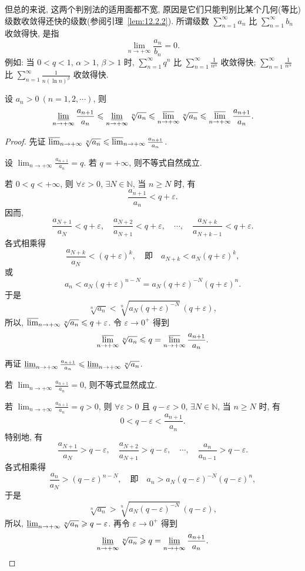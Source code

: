 但总的来说, 这两个判别法的适用面都不宽, 原因是它们只能判别比某个几何(等比)级数收敛得还快的级数(参阅引理~\ref{lem:12.2.2}). 所谓级数 $\sum_{n=1}^{\infty}a_{n}$ 比 $\sum_{n=1}^{\infty}b_{n}$ 收敛得快, 是指
\[
  \lim_{n\to+\infty}\frac{a_{n}}{b_{n}}=0.
\]
例如: 当 $0<q<1$, $\alpha>1$, $\beta>1$ 时, $\sum_{n=1}^{\infty}q^{n}$ 比 $\sum_{n=1}^{\infty}\frac{1}{n^{\alpha}}$ 收敛得快; $\sum_{n=1}^{\infty}\frac{1}{n^{\alpha}}$ 比 $\sum_{n=1}^{\infty}\frac{1}{n(\ln n)^{\beta}}$ 收敛得快.

\begin{lemma}\label{lem:12.2.1}
设 $a_{n}>0\ (n=1,2,\cdots)$, 则
\[
  \varliminf_{n\to+\infty}\frac{a_{n+1}}{a_{n}}
  \leqslant\varliminf_{n\to+\infty}\sqrt[n]{a_{n}}
  \leqslant\varlimsup_{n\to+\infty}\sqrt[n]{a_{n}}
  \leqslant\varlimsup_{n\to+\infty}\frac{a_{n+1}}{a_{n}}.
\]
\end{lemma}

\begin{proof}
先证 $\varlimsup_{n\to+\infty}\sqrt[n]{a_{n}}\leqslant\varlimsup_{n\to+\infty}\frac{a_{n+1}}{a_{n}}$.

设 $\lim_{n\to+\infty}\frac{a_{n+1}}{a_{n}}=q$. 若 $q=+\infty$, 则不等式自然成立.

若 $0<q<+\infty$, 则 $\forall\varepsilon>0$, $\exists N\in\mathbb{N}$, 当 $n\geqslant N$ 时, 有
\[
  \frac{a_{n+1}}{a_{n}}<q+\varepsilon.
\]
因而,
\[
  \frac{a_{N+1}}{a_{N}}<q+\varepsilon,\quad\frac{a_{N+2}}{a_{N+1}}<q+\varepsilon,\quad\cdots,\quad\frac{a_{N+k}}{a_{N+k-1}}<q+\varepsilon.
\]
各式相乘得
\[
  \frac{a_{N+k}}{a_{N}}<(q+\varepsilon)^{k},\quad\text{即}\quad a_{N+k}<a_{N}(q+\varepsilon)^{k},
\]
或
\[
  a_{n}<a_{N}(q+\varepsilon)^{n-N}=a_{N}(q+\varepsilon)^{-N}(q+\varepsilon)^{n}.
\]
于是
\[
  \sqrt[n]{a_{n}}<\sqrt[n]{a_{N}(q+\varepsilon)^{-N}}\,(q+\varepsilon),
\]
所以, $\varlimsup_{n\to+\infty}\sqrt[n]{a_{n}}\leqslant q+\varepsilon$. 令 $\varepsilon\to0^{+}$ 得到
\[
  \varlimsup_{n\to+\infty}\sqrt[n]{a_{n}}\leqslant q=\varlimsup_{n\to+\infty}\frac{a_{n+1}}{a_{n}}.
\]

再证 $\varliminf_{n\to+\infty}\frac{a_{n+1}}{a_{n}}\leqslant\varliminf_{n\to+\infty}\sqrt[n]{a_{n}}$.

若 $\lim_{n\to+\infty}\frac{a_{n+1}}{a_{n}}=0$, 则不等式显然成立.

若 $\lim_{n\to+\infty}\frac{a_{n+1}}{a_{n}}=q>0$, 则 $\forall\varepsilon>0$ 且 $q-\varepsilon>0$, $\exists N\in\mathbb{N}$, 当 $n\geqslant N$ 时, 有
\[
  0<q-\varepsilon<\frac{a_{n+1}}{a_{n}}.
\]
特别地, 有
\[
  \frac{a_{N+1}}{a_{N}}>q-\varepsilon,\quad\frac{a_{N+2}}{a_{N+1}}>q-\varepsilon,\quad\cdots,\quad\frac{a_{n}}{a_{n-1}}>q-\varepsilon.
\]
各式相乘得
\[
  \frac{a_{n}}{a_{N}}>(q-\varepsilon)^{n-N},\quad\text{即}\quad a_{n}>a_{N}(q-\varepsilon)^{-N}(q-\varepsilon)^{n},
\]
于是
\[
  \sqrt[n]{a_{n}}>\sqrt[n]{a_{N}(q-\varepsilon)^{-N}}\,(q-\varepsilon),
\]
所以, $\varliminf_{n\to+\infty}\sqrt[n]{a_{n}}\geqslant q-\varepsilon$. 再令 $\varepsilon\to0^{+}$ 得到
\[
  \varliminf_{n\to+\infty}\sqrt[n]{a_{n}}\geqslant q=\varliminf_{n\to+\infty}\frac{a_{n+1}}{a_{n}}.
\]
\end{proof}

